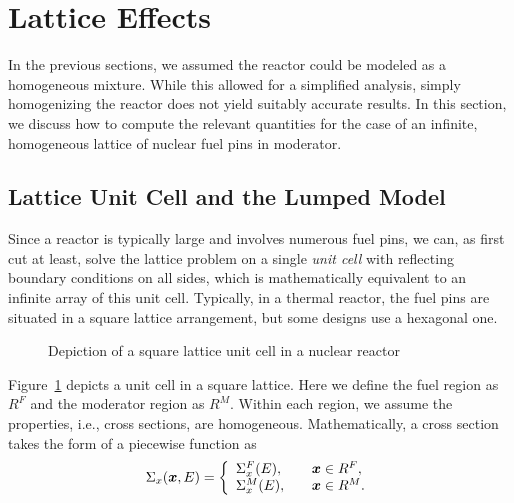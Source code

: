 \section{Lattice Effects}

In the previous sections, we assumed the reactor could be modeled as a homogeneous mixture. While this allowed for a simplified analysis, simply homogenizing the reactor does not yield suitably accurate results. In this section, we discuss how to compute the relevant quantities for the case of an infinite, homogeneous lattice of nuclear fuel pins in moderator.

\subsection{Lattice Unit Cell and the Lumped Model}

Since a reactor is typically large and involves numerous fuel pins, we can, as first cut at least, solve the lattice problem on a single \emph{unit cell} with reflecting boundary conditions on all sides, which is mathematically equivalent to an infinite array of this unit cell. Typically, in a thermal reactor, the fuel pins are situated in a square lattice arrangement, but some designs use a hexagonal one. 

\begin{figure}[tb!]
\begin{center}
\begin{center}
\end{center}
\caption{Depiction of a square lattice unit cell in a nuclear reactor}
\label{Fig:thermalization_squareUnitCell}
\end{center}
\end{figure}

Figure~\ref{Fig:thermalization_squareUnitCell} depicts a unit cell in a square lattice. Here we define the fuel region as $R^F$ and the moderator region as $R^M$. Within each region, we assume the properties, i.e., cross sections, are homogeneous. Mathematically, a cross section takes the form of a piecewise function as
\begin{align}
  \Sigma_x(\bm{x},E) = \left\{ \begin{array}{l l}
  \Sigma_x^F(E), & \quad \bm{x} \in R^F, \\
  \Sigma_x^M(E), & \quad \bm{x} \in R^M. \\ \end{array} \right. \label{Eq:thermalization_piecewiseLatticeXS}
\end{align}

